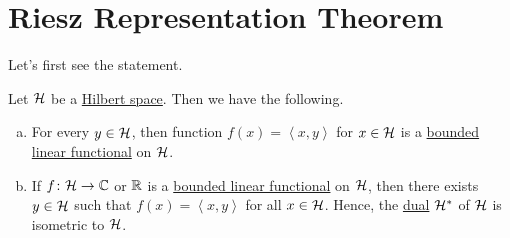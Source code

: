 \section{Riesz Representation Theorem}

Let's first see the statement.

\begin{theorem}\label{thm:Riesz-representation}
	Let \(\mathcal{\MakeUppercase{h}} \) be a \hyperref[def:Hilbert-space]{Hilbert space}. Then we have the following.
	\begin{enumerate}[(a)]
		\item For every \(y\in \mathcal{\MakeUppercase{h}} \), then function \(f(x) = \left\langle x, y \right\rangle \) for \(x\in \mathcal{\MakeUppercase{h}} \) is a \hyperref[def:bounded-linear-functional]{bounded linear functional} on \(\mathcal{\MakeUppercase{h}} \).
		\item If \(f\colon \mathcal{\MakeUppercase{h}} \to \mathbb{\MakeUppercase{c}} \) or \(\mathbb{\MakeUppercase{r}} \) is a \hyperref[def:bounded-linear-functional]{bounded linear functional} on \(\mathcal{\MakeUppercase{h}} \), then there exists \(y\in \mathcal{\MakeUppercase{h}} \) such that \(f(x) = \left\langle x,y \right\rangle \) for all \(x\in \mathcal{\MakeUppercase{h}} \). Hence, the \hyperref[def:dual-space]{dual} \(\mathcal{\MakeUppercase{h}} ^{\ast} \) of \(\mathcal{\MakeUppercase{h}} \) is isometric to \(\mathcal{\MakeUppercase{h}} \).
	\end{enumerate}
\end{theorem}
